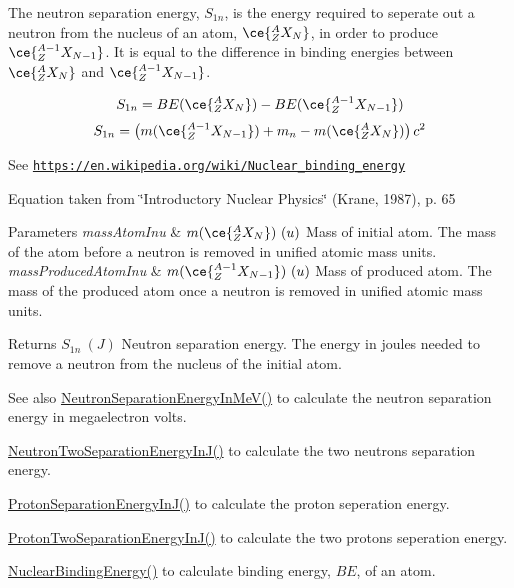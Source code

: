 The neutron separation energy, $S_{1n}$, is the energy required to seperate out a neutron from the nucleus of an atom, $\ce{ ^{A}_{Z}X_{N} }$, in order to produce $\ce{ ^{A-1}_{Z}X_{N-1} }$. It is equal to the difference in binding energies between $\ce{ ^{A}_{Z}X_{N} }$ and $\ce{ ^{A-1}_{Z}X_{N-1} }$.

\[S_{1n} = BE(\ce{ ^{A}_{Z}X_{N} }) - BE(\ce{ ^{A-1}_{Z}X_{N-1} })\] \[S_{1n} = \left ( m(\ce{ ^{A-1}_{Z}X_{N-1} }) + m_n - m(\ce{ ^{A}_{Z}X_{N} }) \right ) c^2\]

See \href{https://en.wikipedia.org/wiki/Nuclear_binding_energy}{\tt https\+://en.\+wikipedia.\+org/wiki/\+Nuclear\+\_\+binding\+\_\+energy}

Equation taken from \char`\"{}\+Introductory Nuclear Physics\char`\"{} (Krane, 1987), p. 65


\begin{DoxyParams}{Parameters}
{\em mass\+Atom\+Inu} & $m(\ce{ ^{A}_{Z}X_{N} })\ (u)$ Mass of initial atom. The mass of the atom before a neutron is removed in unified atomic mass units. \\
\hline
{\em mass\+Produced\+Atom\+Inu} & $m(\ce{ ^{A-1}_{Z}X_{N-1} })\ (u)$ Mass of produced atom. The mass of the produced atom once a neutron is removed in unified atomic mass units. \\
\hline
\end{DoxyParams}
\begin{DoxyReturn}{Returns}
$S_{1n}\ (J)$ Neutron separation energy. The energy in joules needed to remove a neutron from the nucleus of the initial atom. 
\end{DoxyReturn}
\begin{DoxySeeAlso}{See also}
\mbox{\hyperlink{group___e_g_x_phys-_nuclear_separation_energy_ga66133edb5809c81dd9fd60e09ebbef79}{Neutron\+Separation\+Energy\+In\+Me\+V()}} to calculate the neutron separation energy in megaelectron volts. 

\mbox{\hyperlink{group___e_g_x_phys-_nuclear_separation_energy_ga293ac9428420a0adf4235048dbe529b4}{Neutron\+Two\+Separation\+Energy\+In\+J()}} to calculate the two neutrons separation energy. 

\mbox{\hyperlink{group___e_g_x_phys-_nuclear_separation_energy_ga4274d8f5a3860169fd81970707eb582a}{Proton\+Separation\+Energy\+In\+J()}} to calculate the proton seperation energy. 

\mbox{\hyperlink{group___e_g_x_phys-_nuclear_separation_energy_gad7c1d4a32daa8aaa53c5fce37c421f82}{Proton\+Two\+Separation\+Energy\+In\+J()}} to calculate the two protons seperation energy. 

\mbox{\hyperlink{group___e_g_x_phys-_nuclear_binding_energy_gafea41a3c21704414394c3204b35aba98}{Nuclear\+Binding\+Energy()}} to calculate binding energy, $BE$, of an atom. 
\end{DoxySeeAlso}
\mbox{\label{group___e_g_x_phys-_nuclear_separation_energy_ga66133edb5809c81dd9fd60e09ebbef79}} 
